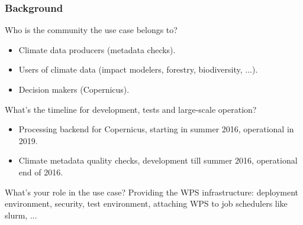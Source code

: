 \documentclass{beamer}
\begin{document}
  \begin{frame}[shrink]
    \frametitle{Background}
    \begin{block}{Who is the community the use case belongs to?}
      \begin{itemize}
        \item Climate data producers (metadata checks). 
        \item Users of climate data (impact modelers, forestry, biodiversity, ...).
        \item Decision makers (Copernicus).
      \end{itemize}
    \end{block}
    \begin{block}{What's the timeline for development, tests and large-scale operation?}
      \begin{itemize}
        \item Processing backend for Copernicus, starting in summer 2016, operational in 2019. 
        \item Climate metadata quality checks, development till summer 2016, operational end of 2016.
      \end{itemize}
    \end{block}
    \begin{block}{What's your role in the use case?}
      Providing the WPS infrastructure: deployment environment, security, test environment, attaching WPS to job schedulers like slurm, ... 
    \end{block}
  \end{frame}

\end{document}
